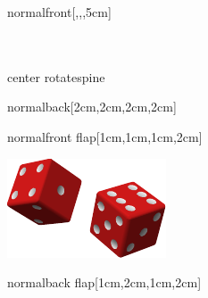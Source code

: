 \documentclass[
    coverwidth=15cm,
    coverheight=20cm,
    spinewidth=25mm,
    flapwidth=6cm,
    wrapwidth=5mm,
    ]{bookcover}
\begin{document}
\begin{bookcover}
\begin{bookcoverelement}{normal}{front}[,,,5cm]
    \centering
    \color{yellow!60!black}\sffamily\bfseries
    \\[26mm]
    \\[8mm]
    \\
\end{bookcoverelement}

\begin{bookcoverelement}{center rotate}{spine}
    \color{yellow!60!black}\huge\sffamily\bfseries
\end{bookcoverelement}

\begin{bookcoverelement}{normal}{back}[2cm,2cm,2cm,2cm]
    \color{white}\kant[1]
\end{bookcoverelement}

\begin{bookcoverelement}{normal}{front flap}[1cm,1cm,1cm,2cm]
    \color{white}\kant[2]
    \vfill
    {\centering\includegraphics{./figures/bookcover-dice.pdf}\par}
\end{bookcoverelement}

\begin{bookcoverelement}{normal}{back flap}[1cm,2cm,1cm,2cm]
    \color{white}\kant[3]
\end{bookcoverelement}

\end{bookcover}
\end{document}
